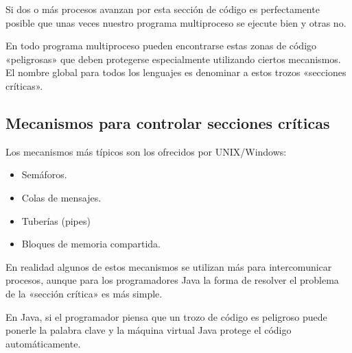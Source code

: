 \documentclass[letterpaper,10pt,spanish]{sphinxmanual}
\begin{document}
Si dos o más procesos avanzan por esta sección de código es perfectamente posible que unas veces nuestro programa multiproceso se ejecute bien y otras no.

En todo programa multiproceso pueden encontrarse estas zonas de código «peligrosas» que deben protegerse especialmente utilizando ciertos mecanismos. El nombre global para todos los lenguajes es denominar a estos trozos «secciones críticas».


\subsection{Mecanismos para controlar secciones críticas}
\label{\detokenize{textos/tema1:mecanismos-para-controlar-secciones-criticas}}
Los mecanismos más típicos son los ofrecidos por UNIX/Windows:
\begin{itemize}
\item {} 
Semáforos.

\item {} 
Colas de mensajes.

\item {} 
Tuberías (pipes)

\item {} 
Bloques de memoria compartida.

\end{itemize}

En realidad algunos de estos mecanismos se utilizan más para intercomunicar procesos, aunque para los programadores Java la forma de resolver el problema de la «sección crítica» es más simple.

En Java, si el programador piensa que un trozo de código es peligroso puede ponerle la palabra clave  y la máquina virtual Java protege el código automáticamente.

\begin{sphinxVerbatim}[commandchars=\\\{\}]
               


        
             
\end{sphinxVerbatim}
\end{document}
